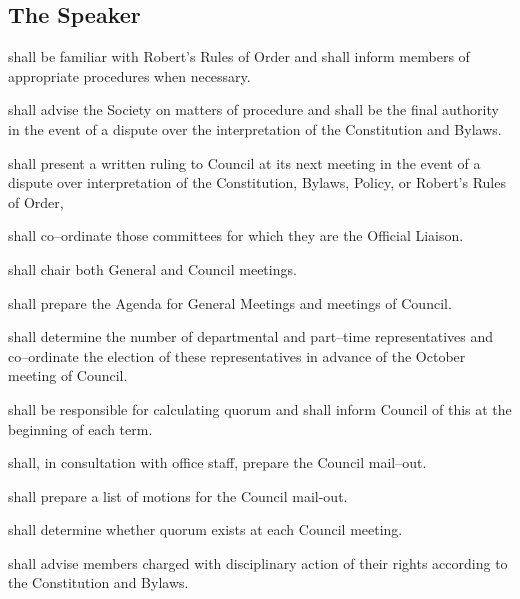 \subsection {The Speaker}
\begin{longenum}[ label*=\thesubsection.\arabic*., align=left]
	\item shall be familiar with Robert's Rules of Order and shall inform members of  appropriate procedures when necessary.
    \item shall advise the Society on matters of procedure and shall be the final authority in the event of a dispute over the interpretation of the Constitution and Bylaws.
    \item shall present a written ruling to Council at its  next meeting in the event of a dispute over interpretation of the Constitution, Bylaws, Policy, or Robert's Rules of Order,
    \item shall co--ordinate those committees for which they are the Official Liaison.
    \item shall chair both General and Council meetings.
    \item shall prepare the Agenda for General Meetings and meetings of Council.
    \item shall determine the number of departmental and part--time representatives and co--ordinate the election of these representatives in advance of the October meeting of Council.
    \item shall be responsible for calculating quorum and shall inform Council of this at the beginning of each term.
    \item shall, in consultation with office staff, prepare the Council mail--out.
    \item shall prepare a list of motions for the Council mail-out.
    \item shall determine whether quorum exists at each Council meeting.
    \item shall advise members charged with disciplinary action of their rights according to the Constitution and Bylaws.

\end{longenum}
